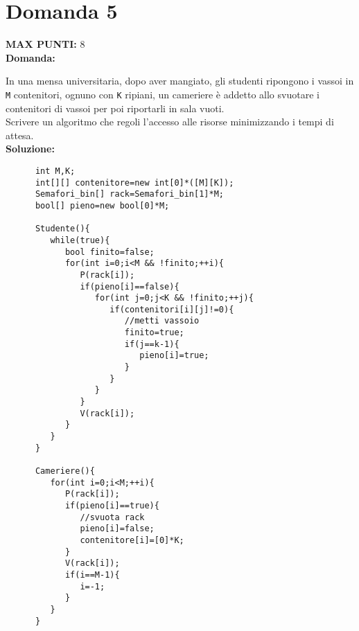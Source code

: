 \documentclass{article}
\begin{document}
   \section*{Domanda 5}
   \textbf{MAX PUNTI:} 8\\
   \textbf{Domanda:}


   In una mensa universitaria, dopo aver mangiato, gli studenti ripongono i vassoi in \verb+M+ contenitori, ognuno con \verb+K+ ripiani, un cameriere è addetto allo svuotare i contenitori di vassoi per poi riportarli in sala vuoti.\\
   Scrivere un algoritmo che regoli l'accesso alle risorse minimizzando i tempi di attesa.\\
   \textbf{Soluzione:}\\
   \begin{lstlisting}
      int M,K;
      int[][] contenitore=new int[0]*([M][K]);
      Semafori_bin[] rack=Semafori_bin[1]*M;
      bool[] pieno=new bool[0]*M;

      Studente(){
         while(true){
            bool finito=false;
            for(int i=0;i<M && !finito;++i){
               P(rack[i]);
               if(pieno[i]==false){
                  for(int j=0;j<K && !finito;++j){
                     if(contenitori[i][j]!=0){
                        //metti vassoio
                        finito=true;
                        if(j==k-1){
                           pieno[i]=true;
                        }
                     }
                  }
               }
               V(rack[i]);
            }
         }
      }

      Cameriere(){
         for(int i=0;i<M;++i){
            P(rack[i]);
            if(pieno[i]==true){
               //svuota rack
               pieno[i]=false;
               contenitore[i]=[0]*K;
            }
            V(rack[i]);
            if(i==M-1){
               i=-1;
            }
         }
      }
   \end{lstlisting}
\end{document}
